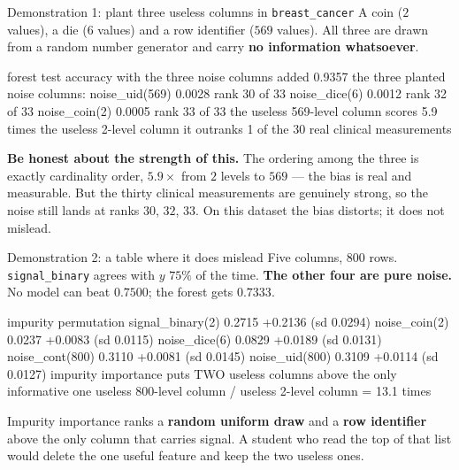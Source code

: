 \documentclass[aspectratio=169]{beamer}
\begin{document}
\begin{frame}[fragile,shrink=6]{Demonstration 1: plant three useless columns in \texttt{breast\_cancer}}
  A coin ($2$ values), a die ($6$ values) and a row identifier ($569$ values).
  All three are drawn from a random number generator and carry \textbf{no
  information whatsoever}.
\begin{outblk}
forest test accuracy with the three noise columns added 0.9357
the three planted noise columns:
   noise_uid(569)             0.0028   rank 30 of 33
   noise_dice(6)              0.0012   rank 32 of 33
   noise_coin(2)              0.0005   rank 33 of 33
the useless 569-level column scores 5.9 times the useless 2-level column
it outranks 1 of the 30 real clinical measurements
\end{outblk}
  \begin{center}\small
    \textbf{Be honest about the strength of this.} The ordering among the
    three is exactly cardinality order, $5.9\times$ from $2$ levels to
    $569$ --- the bias is real and measurable. But the thirty clinical
    measurements are genuinely strong, so the noise still lands at ranks
    $30$, $32$, $33$. On this dataset the bias distorts; it does not mislead.
  \end{center}
\end{frame}

\begin{frame}[fragile,shrink=8]{Demonstration 2: a table where it does mislead}
  Five columns, $800$ rows. \texttt{signal\_binary} agrees with $y$ $75\%$ of
  the time. \textbf{The other four are pure noise.} No model can beat
  $0.7500$; the forest gets $0.7333$.
\begin{outblk}
                     impurity   permutation
signal_binary(2)       0.2715     +0.2136  (sd 0.0294)
noise_coin(2)          0.0237     +0.0083  (sd 0.0115)
noise_dice(6)          0.0829     +0.0189  (sd 0.0131)
noise_cont(800)        0.3110     +0.0081  (sd 0.0145)
noise_uid(800)         0.3109     +0.0114  (sd 0.0127)
impurity importance puts TWO useless columns above the only informative one
useless 800-level column / useless 2-level column = 13.1 times
\end{outblk}
  \begin{center}\small
    Impurity importance ranks a \textbf{random uniform draw} and a
    \textbf{row identifier} above the only column that carries signal. A
    student who read the top of that list would delete the one useful feature
    and keep the two useless ones.
  \end{center}
\end{frame}
\end{document}
